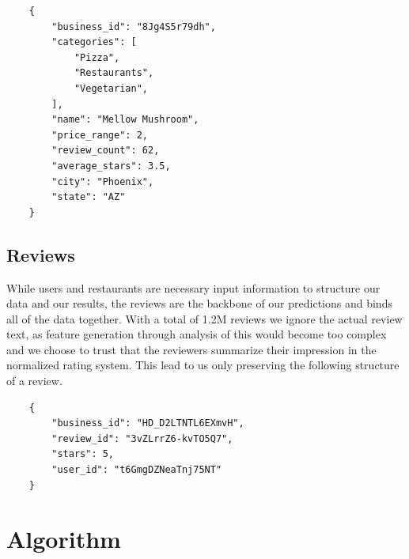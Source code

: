 \documentclass[10pt,twocolumn,letterpaper]{article}
\begin{document}
\begin{verbatim}
	{
	    "business_id": "8Jg4S5r79dh",
	    "categories": [
	        "Pizza",
	        "Restaurants",
	        "Vegetarian",
	    ],
	    "name": "Mellow Mushroom",
	    "price_range": 2,
	    "review_count": 62,
 		"average_stars": 3.5,
        "city": "Phoenix",
 		"state": "AZ"
	}
\end{verbatim}

\subsection{Reviews}
While users and restaurants are necessary input information to structure our data and our results, the reviews are the backbone of our predictions and binds all of the data together. With a total of 1.2M reviews we ignore the actual review text, as feature generation through analysis of this would become too complex and we choose to trust that the reviewers summarize their impression in the normalized rating system. This lead to us only preserving the following structure of a review.

\begin{verbatim}
	{
	    "business_id": "HD_D2LTNTL6EXmvH",
	    "review_id": "3vZLrrZ6-kvTO5Q7",
	    "stars": 5,
	    "user_id": "t6GmgDZNeaTnj75NT"
	}
\end{verbatim}


\section{Algorithm}
\end{document}

